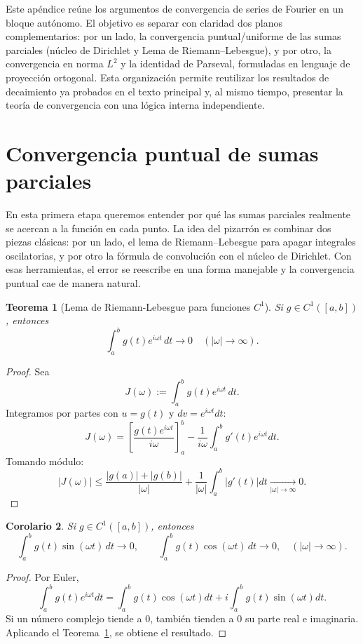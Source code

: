 \documentclass[a4paper,11pt]{report}
\newtheorem{theorem}{Teorema}[chapter]
\newtheorem{corollary}[theorem]{Corolario}
\begin{document}
Este apéndice reúne los argumentos de convergencia de series de Fourier en un bloque autónomo. El objetivo es separar con claridad dos planos complementarios: por un lado, la convergencia puntual/uniforme de las sumas parciales (núcleo de Dirichlet y Lema de Riemann--Lebesgue), y por otro, la convergencia en norma $L^2$ y la identidad de Parseval, formuladas en lenguaje de proyección ortogonal. Esta organización permite reutilizar los resultados de decaimiento ya probados en el texto principal y, al mismo tiempo, presentar la teoría de convergencia con una lógica interna independiente.

\section{Convergencia puntual de sumas parciales}

En esta primera etapa queremos entender por qu\'e las sumas parciales realmente se acercan a la funci\'on en cada punto. La idea del pizarr\'on es combinar dos piezas cl\'asicas: por un lado, el lema de Riemann--Lebesgue para apagar integrales oscilatorias, y por otro la f\'ormula de convoluci\'on con el n\'ucleo de Dirichlet. Con esas herramientas, el error se reescribe en una forma manejable y la convergencia puntual cae de manera natural.

\begin{theorem}[Lema de Riemann-Lebesgue para funciones $C^1$]\label{cor:riemann_lebesgue_C1}
Si $g\in C^1([a,b])$, entonces
\[
\int_a^b g(t)e^{i\omega t}\,dt\to 0
\quad (|\omega|\to\infty).
\]
\end{theorem}

\begin{proof}
Sea
\[
J(\omega):=\int_a^b g(t)e^{i\omega t}\,dt.
\]
Integramos por partes con $u=g(t)$ y $dv=e^{i\omega t}dt$:
\[
J(\omega)=\left[\frac{g(t)e^{i\omega t}}{i\omega}\right]_a^b-\frac{1}{i\omega}\int_a^b g'(t)e^{i\omega t}dt.
\]
Tomando módulo:
\[
|J(\omega)|
\le \frac{|g(a)|+|g(b)|}{|\omega|}
+\frac{1}{|\omega|}\int_a^b|g'(t)|dt
\xrightarrow[|\omega|\to\infty]{}0.
\]
\end{proof}

\begin{corollary}
Si $g\in C^1([a,b])$, entonces
\[
\int_a^b g(t)\sin(\omega t)\,dt\to 0,
\qquad
\int_a^b g(t)\cos(\omega t)\,dt\to 0,
\quad (|\omega|\to\infty).
\]
\end{corollary}

\begin{proof}
Por Euler,
\[
\int_a^b g(t)e^{i\omega t}dt
=\int_a^b g(t)\cos(\omega t)dt
+i\int_a^b g(t)\sin(\omega t)dt.
\]
Si un número complejo tiende a $0$, también tienden a $0$ su parte real e imaginaria. Aplicando el Teorema~\ref{cor:riemann_lebesgue_C1}, se obtiene el resultado.
\end{proof}
\end{document}
